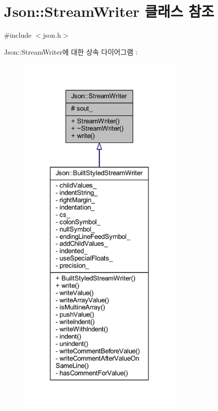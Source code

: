 \hypertarget{class_json_1_1_stream_writer}{}\section{Json\+:\+:Stream\+Writer 클래스 참조}
\label{class_json_1_1_stream_writer}


{\ttfamily \#include $<$json.\+h$>$}



Json\+:\+:Stream\+Writer에 대한 상속 다이어그램 \+: \nopagebreak
\begin{figure}[H]
\begin{center}
\leavevmode
\includegraphics[width=228pt]{class_json_1_1_stream_writer__inherit__graph}
\end{center}
\end{figure}


